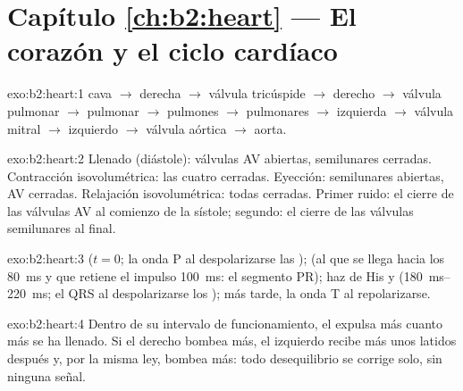 \section*{Capítulo \ref{ch:b2:heart} --- El corazón y el ciclo cardíaco}

\begin{solution}{exo:b2:heart:1}
 cava $\to$  derecha $\to$ válvula tricúspide $\to$ 
derecho $\to$ válvula pulmonar $\to$  pulmonar $\to$ pulmones
$\to$  pulmonares $\to$  izquierda $\to$ válvula mitral $\to$
 izquierdo $\to$ válvula aórtica $\to$ aorta.
\end{solution}

\begin{solution}{exo:b2:heart:2}
Llenado (diástole): válvulas AV abiertas, semilunares cerradas.
Contracción isovolumétrica: las cuatro cerradas. Eyección: semilunares
abiertas, AV cerradas. Relajación isovolumétrica: todas cerradas. Primer
ruido: el cierre de las válvulas AV al comienzo de la sístole; segundo:
el cierre de las válvulas semilunares al final.
\end{solution}

\begin{solution}{exo:b2:heart:3}
 ($t = 0$; la onda P al despolarizarse las
);  (al que se llega hacia los
\qty{80}{ms} y que retiene el impulso \qty{100}{ms}: el segmento PR); haz
de His y  (\qtyrange{180}{220}{ms}; el QRS al
despolarizarse los ); más tarde, la onda T al repolarizarse.
\end{solution}

\begin{solution}{exo:b2:heart:4}
Dentro de su intervalo de funcionamiento, el  expulsa más cuanto
más se ha llenado. Si el  derecho bombea más, el izquierdo
recibe más unos latidos después y, por la misma ley, bombea más: todo
desequilibrio se corrige solo, sin ninguna señal.
\end{solution}

